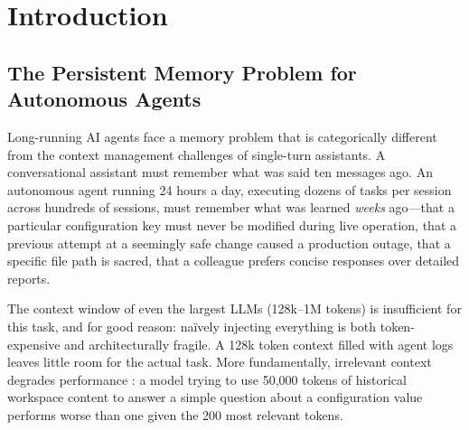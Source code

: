 \documentclass[11pt]{article}
\begin{document}
\begin{abstract}
A detailed forensic analysis of the 12-phase development cycle documents eight
categories of implementation failure modes, including silent NaN propagation via Apache Arrow
type mismatches, BM25 sigmoid score saturation causing rank-washout, cross-encoder score
compression, and pipeline stage ordering bugs. We argue that the gap between benchmark
RAG and production agentic RAG is larger than commonly acknowledged, and that iterative
quantitative evaluation (not intuition) is the only reliable guide to system improvement.

The complete system is validated in an isolated Docker harness with 18 self-service
memory tools, 37,000+ indexed chunks, and a 483-test validation suite. All code,
benchmarks, and evaluation scripts are open-source at
\url{https://github.com/kleinpanic/memory-spark}.
\end{abstract}

\section{Introduction}
\label{sec:intro}

\subsection{The Persistent Memory Problem for Autonomous Agents}

Long-running AI agents face a memory problem that is categorically different from the
context management challenges of single-turn assistants. A conversational assistant
must remember what was said ten messages ago. An autonomous agent running 24 hours a
day, executing dozens of tasks per session across hundreds of sessions, must remember
what was learned \emph{weeks} ago---that a particular configuration key must never be
modified during live operation, that a previous attempt at a seemingly safe change
caused a production outage, that a specific file path is sacred, that a colleague
prefers concise responses over detailed reports.

The context window of even the largest LLMs (128k--1M tokens) is insufficient for this
task, and for good reason: naïvely injecting everything is both token-expensive and
architecturally fragile. A 128k token context filled with agent logs leaves little
room for the actual task. More fundamentally, irrelevant context degrades performance
\citep{shi2023large}: a model trying to use 50,000 tokens of historical workspace
content to answer a simple question about a configuration value performs worse than one
given the 200 most relevant tokens.
\end{document}

